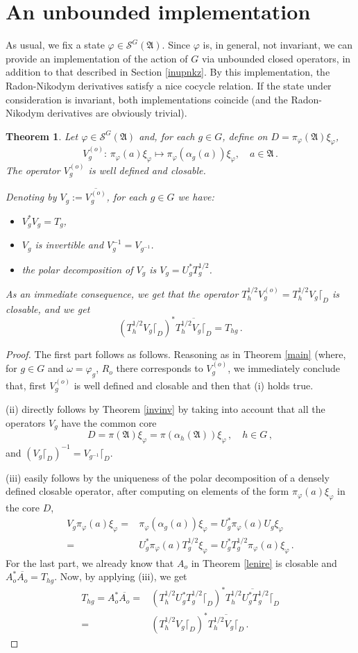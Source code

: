 \documentclass[12pt]{amsart}
\numberwithin{equation}{section}
\def\cs{{\mathcal S}}
\def\ga{{\mathfrak A}} \def\gpa{{\mathfrak a}}
\def\a{\alpha}
\def\f{\varphi}\def\ff{\phi} \def\F{\Phi}
\def\om{\omega} \def\Om{\Omega}
\newtheorem{thm}{Theorem}[section]
\begin{document}
\section{An unbounded implementation}
\label{lenire00}

As usual, we fix a state $\f\in\cs^G(\ga)$. Since $\f$ is, in general, not invariant, we can provide an implementation of the action
of $G$ via unbounded closed operators, in addition to that described in Section \ref{inupnkz}.
By this implementation, the Radon-Nikodym derivatives satisfy a nice cocycle relation. 
If the state under consideration is invariant, both implementations coincide (and the Radon-Nikodym derivatives are obviously trivial).
\begin{thm}
\label{ohfmel}
Let $\f\in\cs^G(\ga)$ and, for each $g\in G$, define on $D=\pi_\f(\ga)\xi_\f$,
$$
V^{(o)}_g:\, \pi_\f(a)\xi_\f\mapsto \pi_\f(\a_g(a))\xi_\f,\quad a\in \ga\,.
$$
The operator $V^{(o)}_g$ is well defined and closable. 

Denoting by $V_g:=\overline{V^{(o)}_g}$, for each $g\in G$ we have:
\begin{itemize}
\item[(i)] $V_g^*V_g=T_g$,
\item[(ii)] $V_g$ is invertible and $V_g^{-1}=V_{g^{-1}}$.
\item[(iii)] the polar decomposition of $V_g$ is $V_g=U^*_g T_g^{1/2}$.
\end{itemize}
As an immediate consequence, we get that the operator 
$T_h^{1/2}V^{(o)}_g=T_h^{1/2}V_g\lceil_D$ is closable, and we get
$$
\left(T_h^{1/2}V_g\lceil_D\right)^*\overline{T_h^{1/2}V_g\lceil_D}=T_{hg}\,.
$$
\end{thm}
\begin{proof}
The first part follows as follows. Reasoning as in Theorem \ref{main} (where, for $g\in G$ and $\om=\f_g$,
$R_o$ there corresponds to  $V^{(o)}_g$, we immediately conclude that, first $V^{(o)}_g$ is well defined and closable and then
that (i) holds true. 

(ii) directly follows by Theorem \ref{invinv} by taking into account that all the operators
$V_{g}$ have the common core
$$
D=\pi(\ga)\xi_\f=\pi(\a_h(\ga))\xi_\f\,,\quad h\in G\,,
$$
and $\left(V_g\lceil_D\right)^{-1}=V_{g^{-1}}\lceil_D$.

(iii) easily follows by the uniqueness of the polar decomposition of a densely defined closable operator, after computing on elements of the form $\pi_\f(a)\xi_\f$ in the core $D$,
\begin{align*}
V_g\pi_\f(a)\xi_\f=&\pi_\f(\a_g(a))\xi_\f=U^*_g\pi_\f(a)U_g\xi_\f\\
=&U^*_g\pi_\f(a)T^{1/2}_g\xi_\f
=U^*_gT^{1/2}_g\pi_\f(a)\xi_\f\,.
\end{align*}
For the last part, we already know that $A_o$ in Theorem \ref{lenire} is closable and $A_o^*\overline{A_o}=T_{hg}$. Now, by applying (iii), we get
\begin{align*}
T_{hg}=A_o^*\overline{A_o}=&\left(T_h^{1/2}U^*_g T_g^{1/2}\lceil_D\right)^*\overline{T_h^{1/2}U^*_g T_g^{1/2}\lceil_D}\\
=&\left(T_h^{1/2}V_g\lceil_D\right)^*\overline{T_h^{1/2}V_g\lceil_D}\,.
\end{align*}
\end{proof}
\end{document}
